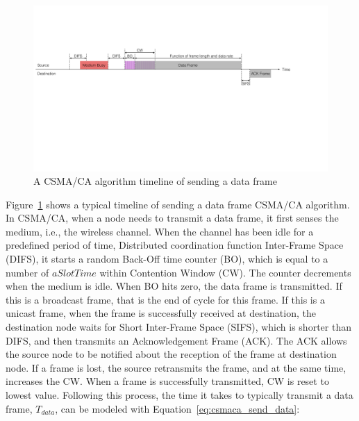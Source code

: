 \documentclass[12pt]{report}
\begin{document}
\begin{figure}[h]
  \begin{center}
    \includegraphics[width=\textwidth]{figures/csmaca.pdf}
    \caption{\label{fig:csmaca}A CSMA/CA algorithm timeline of sending a data frame}
  \end{center}
\end{figure}

Figure~\ref{fig:csmaca} shows a typical timeline of sending a data frame CSMA/CA algorithm. In CSMA/CA, when a node needs to transmit a data frame, it first senses the medium, i.e., the wireless channel. When the channel has been idle for a predefined period of time, Distributed coordination function Inter-Frame Space (DIFS), it starts a random Back-Off time counter (BO), which is equal to a number of $aSlotTime$ within Contention Window (CW). The counter decrements when the medium is idle. When BO hits zero, the data frame is transmitted. If this is a broadcast frame, that is the end of cycle for this frame. If this is a unicast frame, when the frame is successfully received at destination, the destination node waits for Short Inter-Frame Space (SIFS), which is shorter than DIFS, and then transmits an Acknowledgement Frame (ACK). The ACK allows the source node to be notified about the reception of the frame at destination node. If a frame is lost, the source retransmits the frame, and at the same time, increases the CW. When a frame is successfully transmitted, CW is reset to lowest value. Following this process, the time it takes to typically transmit a data frame, $T_{data}$, can be modeled with Equation~\ref{eq:csmaca_send_data}:
\end{document}
